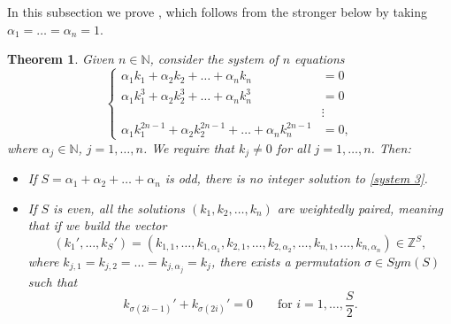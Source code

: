 \documentclass[a4paper,10pt,reqno]{article}
\theoremstyle{definition}
\theoremstyle{plain}
\newtheorem{theorem}[definition]{Theorem}
\theoremstyle{plain}
\theoremstyle{definition}
\theoremstyle{plain}
\theoremstyle{plain}
\theoremstyle{plain}
\theoremstyle{definition}
\theoremstyle{definition}
\def \N{\mathbb N}
\def \Z{\mathbb Z}
\begin{document}
In this subsection we prove , which follows from the stronger  below by taking $\alpha_1=\ldots=\alpha_n=1$.

\begin{theorem} \label{thm: system for resonant 2}
Given $n\in\N$, consider the system of $n$ equations
\begin{equation}
\begin{cases}
\alpha_1 k_1 + \alpha_2 k_2+\ldots+ \alpha_n k_n & = 0 \\
\alpha_1 k_1^3 + \alpha_2 k_2^3 + \ldots+ \alpha_n k_n^3 & = 0 \\
& \vdots \\
\alpha_1 k_1^{2n-1} + \alpha_2 k_2^{2n-1} +\ldots + \alpha_n k_n^{2n-1} & =0,
\end{cases}
\label{system 3}
\end{equation}
where $\alpha_j \in \N$, $j=1,\ldots, n$. We require that $k_j \neq 0$ for all $j=1,\ldots,n$. Then:

\begin{itemize}
\item If $S = \alpha_1 + \alpha_2 + \ldots + \alpha_n$ is odd, there is no integer solution to \eqref{system 3}. 

\item If $S$ is even, all the solutions $(k_1,k_2,\ldots,k_n)$ are \emph{weightedly paired}, meaning that if we build the vector 
\[
(k_1',\ldots,k_S')=(k_{1,1},\ldots,k_{1,\alpha_1},k_{2,1},\ldots,k_{2,\alpha_2},\ldots,k_{n,1},\ldots,k_{n,\alpha_n}) \in \Z^{S},
\]
where $k_{j,1}=k_{j,2}=\ldots=k_{j,\alpha_j}=k_j$, there exists a permutation $\sigma \in Sym(S)$ such that 
\[
k_{\sigma(2i-1)}'+k_{\sigma(2i)}'=0 \qquad \text{for $i=1,\ldots,\frac{S}{2}.$}
\]
\end{itemize}
\end{theorem}
\end{document}
